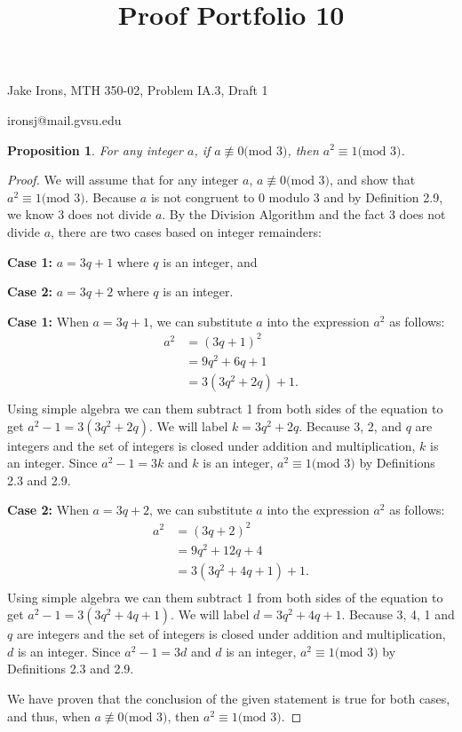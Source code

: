 \documentclass[11 pt]{article}
\title{Proof Portfolio 10}
\newtheorem{proposition}{Proposition}
\newcommand{\newpar}{\vspace{.15in}\noindent}
\begin{document}
\noindent Jake Irons, MTH 350-02, Problem IA.3, Draft 1

\noindent ironsj@mail.gvsu.edu

\newpar
\begin{proposition}
For any integer $a$, if $a\not\equiv \mbox{0(mod 3)}$, then $a^2\equiv \mbox{1(mod 3)}$.
\end{proposition}
\begin{proof}
\newpar 
We will assume that for any integer $a$, $a\not\equiv \mbox{0(mod 3)}$, and show that $a^2\equiv \mbox{1(mod 3)}$. Because $a$ is not congruent to 0 modulo 3 and by Definition 2.9, we know 3 does not divide $a$. By the Division Algorithm and the fact 3 does not divide $a$, there are two cases based on integer remainders:

\textbf{Case 1:} $a=3q+1$ where $q$ is an integer, and

\textbf{Case 2:} $a=3q+2$ where $q$ is an integer.

\newpar
\textbf{Case 1:} When $a=3q+1$, we can substitute $a$ into the expression $a^2$ as follows:
\begin{align*}
a^2&=(3q+1)^2 \\
&= 9q^2+6q+1 \\
&= 3(3q^2+2q)+1. \\
\end{align*}
\noindent
Using simple algebra we can them subtract 1 from both sides of the equation to get $a^2-1=3(3q^2+2q)$. We will label $k=3q^2+2q$. Because 3, 2, and $q$ are integers and the set of integers is closed under addition and multiplication, $k$ is an integer. Since $a^2-1=3k$ and $k$ is an integer, $a^2\equiv \mbox{1(mod 3)}$ by Definitions 2.3 and 2.9. 

\newpar
\textbf{Case 2:} When $a=3q+2$, we can substitute $a$ into the expression $a^2$ as follows:
\begin{align*}
a^2&=(3q+2)^2 \\
&= 9q^2+12q+4 \\
&= 3(3q^2+4q+1)+1. \\
\end{align*}
\noindent
Using simple algebra we can them subtract 1 from both sides of the equation to get $a^2-1=3(3q^2+4q+1)$. We will label $d=3q^2+4q+1$. Because 3, 4, 1 and $q$ are integers and the set of integers is closed under addition and multiplication, $d$ is an integer. Since $a^2-1=3d$ and $d$ is an integer, $a^2\equiv \mbox{1(mod 3)}$ by Definitions 2.3 and 2.9. 

\newpar 
We have proven that the conclusion of the given statement is true for both cases, and thus, when $a\not\equiv \mbox{0(mod 3)}$, then $a^2\equiv \mbox{1(mod 3)}$.
\end{proof}
\end{document}
